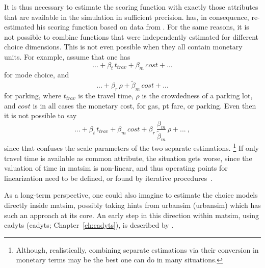 It is thus necessary to estimate the scoring function with exactly those attributes that are available in the simulation in sufficient precision.
%
\citet[][]{Kickhoefer_MastersThesis_2009} has, in consequence, re-estimated his scoring function based on data from \citet[][]{VrticEtc2008ReisekostenSVIBericht}. 
%
For the same reasons, it is not possible to combine functions that were independently estimated for different choice dimensions.  This is not even possible when they all contain monetary units.  For example, assume that one has
\[
... + \beta_{t} \, t_{trav} + \beta_{m} \, cost + ...
\]
for mode choice, and
\[
... + \beta_r \, \rho + \tilde\beta_{m} \, cost + ...
\]
for parking, where $t_{trav}$ is the travel time, $\rho$ is the crowdedness of a parking lot, and $cost$ is in all cases the monetary cost, \eg for gas, \gls{pt} fare, or parking.  Even then it is not possible to say
\[
... + \beta_{t} \, t_{trav} + \beta_{m} \, cost 
%
+ \beta_r \, \frac{\beta_m}{\tilde\beta_m} \, \rho + ... \ ,
\]
since that confuses the scale parameters of the two separate estimations.%
\footnote{%
%
Although, realistically, combining separate estimations via their conversion in monetary terms may be the best one can do in many situations.
%
} If only travel time is available as common attribute, the situation gets worse, since the valuation of time in \gls{matsim} is non-linear, and thus operating points for linearization need to be defined, or found by iterative procedures~\citep[][p.75ff]{Horni_PhDThesis_2013}.

As a long-term perspective, one could also imagine to estimate the choice models directly inside \gls{matsim}, possibly taking hints from \acrshort{urbansim} (\acrlong{urbansim}) which has such an approach at its core.  An early step in this direction within \gls{matsim}, using \acrshort{cadyts} (\acrlong{cadyts}; Chapter~\ref{ch:cadyts}), is described by \citet{FloetteroedChenNagel2012ChoiceModelRefinement}.

% 



